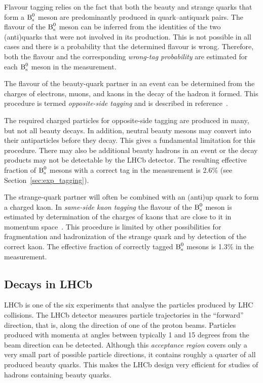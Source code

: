 Flavour tagging relies on the fact that both the beauty and strange quarks that form a $\text{B}_\text{s}^\text{0}$ meson are predominantly produced in
quark--antiquark pairs. The flavour of the $\text{B}_\text{s}^\text{0}$ meson can be inferred from the identities of the two (anti)quarks that were not involved
in its production. This is not possible in all cases and there is a probability that the determined flavour is wrong. Therefore, both the
flavour and the corresponding \emph{wrong-tag probability} are estimated for each $\text{B}_\text{s}^\text{0}$ meson in the \BstoJpsiKK{} measurement.

The flavour of the beauty-quark partner in an event can be determined from the charges of electrons, muons, and kaons in the decay of the
hadron it formed. This procedure is termed \emph{opposite-side tagging} and is described in reference~\cite{LHCb-PAPER-2011-027}.

The required charged particles for opposite-side tagging are produced in many, but not all beauty decays. In addition, neutral beauty
mesons may convert into their antiparticles before they decay. This gives a fundamental limitation for this procedure. There may also be
additional beauty hadrons in an event or the decay products may not be detectable by the LHCb detector. The resulting effective fraction of
$\text{B}_\text{s}^\text{0}$ mesons with a correct tag in the \BstoJpsiKK{} measurement is 2.6\% (see Section~\ref{sec:exp_tagging}).

The strange-quark partner will often be combined with an (anti)up quark to form a charged kaon. In \emph{same-side kaon tagging} the
flavour of the $\text{B}_\text{s}^\text{0}$ meson is estimated by determination of the charges of kaons that are close to it in momentum
space~\cite{LHCb-CONF-2012-033}. This procedure is limited by other possibilities for fragmentation and hadronization of the strange quark
and by detection of the correct kaon. The effective fraction of correctly tagged $\text{B}_\text{s}^\text{0}$ mesons is 1.3\% in the \BstoJpsiKK{} measurement.


\subsection{\texorpdfstring{\BstoJpsiKK}{Bs0->J/psi K+K-} Decays in LHCb}
\label{subsec:intro_LHCb_Jpsiphi}

LHCb is one of the six experiments that analyse the particles produced by LHC collisions. The LHCb detector measures particle trajectories
in the ``forward'' direction, that is, along the direction of one of the proton beams. Particles produced with momenta at angles between
typically 1 and 15 degrees from the beam direction can be detected. Although this \emph{acceptance region} covers only a very small part of
possible particle directions, it contains roughly a quarter of all produced beauty quarks. This makes the LHCb design very efficient for
studies of hadrons containing beauty quarks.

